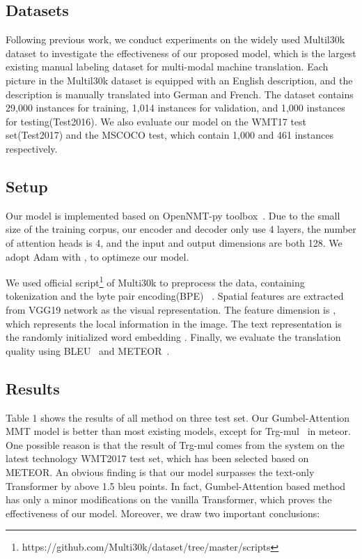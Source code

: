 \documentclass{article}
\begin{document}
\subsection{Datasets}
Following previous work, we conduct experiments on the widely used  Multil30k~\cite{DBLP:conf/acl/ElliottFSS16} dataset to investigate the effectiveness of our proposed model, which is the largest existing manual labeling dataset for multi-modal machine translation. 
Each picture in the Multil30k dataset is equipped with an English description, and the description is manually translated into German and French. 
The dataset contains 29,000 instances for training, 1,014 instances for validation, and 1,000 instances for testing(Test2016). We also evaluate our model on the WMT17 test set(Test2017) and the MSCOCO test, which contain 1,000 and 461 instances respectively.

\subsection{Setup}
Our model is implemented based on OpenNMT-py toolbox~\cite{DBLP:conf/acl/KleinKDSR17}. Due to the small size of the training corpus, our encoder and decoder only use 4 layers, the number of attention heads is 4, and the input and output dimensions are both 128. We adopt Adam with ,  to optimeze our model.


We used official script\footnote{https://github.com/Multi30k/dataset/tree/master/scripts} of Multi30k to preprocess the data, containing tokenization and the byte pair encoding(BPE) ~\cite{DBLP:conf/acl/SennrichHB16a}. Spatial features are extracted from VGG19 network as the visual representation. The feature dimension is  , which represents the local information in the image. The text representation is the randomly initialized word embedding
. Finally, we evaluate the translation quality using BLEU~\cite{DBLP:conf/acl/PapineniRWZ02} and METEOR~\cite{DBLP:conf/wmt/DenkowskiL11}.







\subsection{Results}

Table 1 shows the results of all method on three test set. Our Gumbel-Attention MMT model is better than most existing models, except for Trg-mul~\cite{DBLP:conf/wmt/CaglayanABGBBMH17} in meteor. One possible reason is that the result of Trg-mul comes from the system on the latest technology WMT2017 test set, which has been selected based on METEOR. An obvious finding is that our model surpasses the text-only Transformer by above 1.5 bleu points. In fact, Gumbel-Attention based method has only a minor modifications on the vanilla Transformer, which proves the effectiveness of our model. Moreover, we draw two important conclusions:
\end{document}
